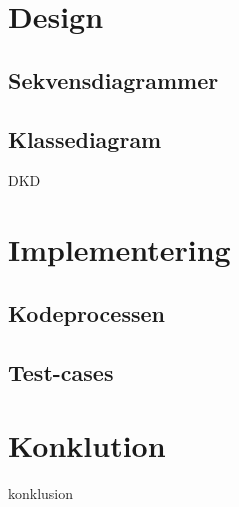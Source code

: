 \documentclass{article}
\begin{document}
{\section{Design}

\subsection{Sekvensdiagrammer}

\subsection{Klassediagram}
{DKD}

\section{Implementering}
\subsection{Kodeprocessen}

\subsection{Test-cases}

\section{Konklution}
{konklusion}
}
\end{document}
